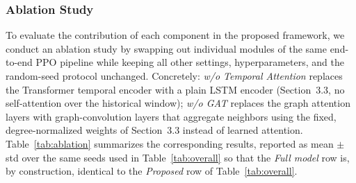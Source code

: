\documentclass[runningheads]{llncs}
\begin{document}
\subsubsection{Ablation Study}

To evaluate the contribution of each component in the proposed framework, we conduct an ablation study by swapping out individual modules of the same end-to-end PPO pipeline while keeping all other settings, hyperparameters, and the random-seed protocol unchanged. Concretely: \emph{w/o Temporal Attention} replaces the Transformer temporal encoder with a plain LSTM encoder (Section~3.3, no self-attention over the historical window); \emph{w/o GAT} replaces the graph attention layers with graph-convolution layers that aggregate neighbors using the fixed, degree-normalized weights of Section~3.3 instead of learned attention. Table~\ref{tab:ablation} summarizes the corresponding results, reported as mean $\pm$ std over the same seeds used in Table~\ref{tab:overall} so that the \emph{Full model} row is, by construction, identical to the \emph{Proposed} row of Table~\ref{tab:overall}.
\end{document}
